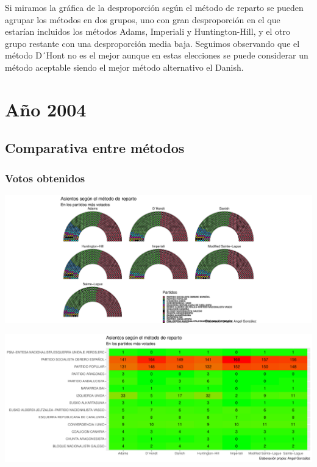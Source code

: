 \documentclass[12pt,a4paper,]{book}
\numberwithin{dummy}{section}
\theoremstyle{ocrenumbox}
\theoremstyle{blacknumex}
\theoremstyle{blacknumbox}
\theoremstyle{ocrenum}
\theoremstyle{ocrenum}
\begin{document}
Si miramos la gráfica de la desproporción según el método de reparto se
pueden agrupar los métodos en dos grupos, uno con gran desproporción en
el que estarían incluidos los métodos Adams, Imperiali y
Huntington-Hill, y el otro grupo restante con una desproporción media
baja. Seguimos observando que el método D´Hont no es el mejor aunque en
estas elecciones se puede considerar un método aceptable siendo el mejor
método alternativo el Danish.

\hypertarget{auxf1o-2004}{%
\section{Año 2004}\label{auxf1o-2004}}

\hypertarget{comparativa-entre-muxe9todos-8}{%
\subsection{Comparativa entre
métodos}\label{comparativa-entre-muxe9todos-8}}

\hypertarget{votos-obtenidos-8}{%
\subsubsection{Votos obtenidos}\label{votos-obtenidos-8}}

\begin{center}\includegraphics[width=0.95\linewidth]{figurasR/unnamed-chunk-134-1} \end{center}

\begin{center}\includegraphics[width=0.95\linewidth]{figurasR/unnamed-chunk-134-2} \end{center}
\end{document}
